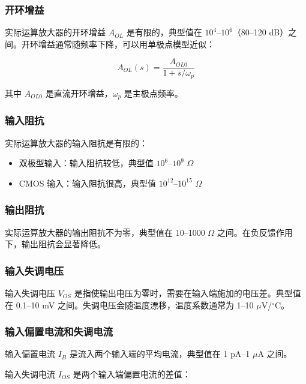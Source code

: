 \subsubsection{开环增益}

实际运算放大器的开环增益 $A_{OL}$ 是有限的，典型值在 $10^4$--$10^6$（80--120 dB）之间。开环增益通常随频率下降，可以用单极点模型近似：

\begin{equation}
A_{OL}(s) = \frac{A_{OL0}}{1 + s/\omega_p} \label{eq:opamp-open-loop-gain}
\end{equation}

其中 $A_{OL0}$ 是直流开环增益，$\omega_p$ 是主极点频率。

\subsubsection{输入阻抗}

实际运算放大器的输入阻抗是有限的：
\begin{itemize}
  \item 双极型输入：输入阻抗较低，典型值 $10^6$--$10^9$ $\Omega$
  \item CMOS 输入：输入阻抗很高，典型值 $10^{12}$--$10^{15}$ $\Omega$
\end{itemize}

\subsubsection{输出阻抗}

实际运算放大器的输出阻抗不为零，典型值在 10--1000 $\Omega$ 之间。在负反馈作用下，输出阻抗会显著降低。

\subsubsection{输入失调电压}

输入失调电压 $V_{OS}$ 是指使输出电压为零时，需要在输入端施加的电压差。典型值在 0.1--10 mV 之间。失调电压会随温度漂移，温度系数通常为 1--10 $\mu$V/$^\circ$C。

\subsubsection{输入偏置电流和失调电流}

输入偏置电流 $I_B$ 是流入两个输入端的平均电流，典型值在 1 pA--1 $\mu$A 之间。

输入失调电流 $I_{OS}$ 是两个输入端偏置电流的差值：

